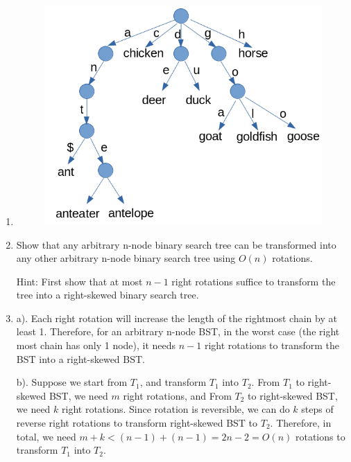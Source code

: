 \documentclass[12pt,a4paper]{article}
\makeatletter
\newtheorem*{solution}{Solution}
\theoremstyle{definition}
\renewenvironment{solution}[1][Solution] {\par\pushQED{\qed}\normalfont\topsep6\p@\@plus6\p@\relax\trivlist\item[\hskip\labelsep\bfseries#1\@addpunct{.}]\ignorespaces}{\popQED\endtrivlist\@endpefalse} \makeatother
\makeatother
\begin{document}
\begin{enumerate}
	\begin{solution} 
	\hspace*{\fill}
		\begin{figure}[ht]
			\centering
			\includegraphics[width=0.9\linewidth]{trie.png}
			\label{fig:6}
		\end{figure}
	\end{solution}

\item  Show that any arbitrary n-node binary search tree can be transformed into any other arbitrary n-node binary search tree using $O(n)$ rotations. 

	{\color{blue} Hint: First show that at most $n − 1$ right rotations suffice to transform the tree into a right-skewed binary search tree.}

	\begin{solution} 
		\hspace*{\fill}
		
		a). Each right rotation will increase the length of the rightmost chain by at least 1. Therefore, for an arbitrary n-node BST, in the worst case (the right most chain has only 1 node), it needs $n-1$ right rotations to transform the BST into a right-skewed BST.
		
		b). Suppose we start from $T_1$, and transform $T_1$ into $T_2$. From $T_1$ to right-skewed BST, we need $m$ right rotations, and From $T_2$ to right-skewed BST, we need $k$ right rotations. Since rotation is reversible, we can do $k$ steps of reverse right rotations to transform right-skewed BST to $T_2$. Therefore, in total, we need $m+k < (n-1) + (n-1) = 2n-2 = O(n)$ rotations to transform $T_1$ into $T_2$.
		

\end{solution}
\end{enumerate}
\end{document}
